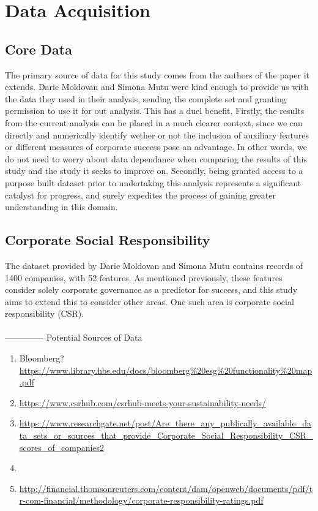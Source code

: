 \section{Data Acquisition}
\subsection{Core Data}
{The primary source of data for this study comes from the authors of the paper it extends. Darie Moldovan and Simona Mutu were kind enough to provide us with the data they used in their analysis, sending the complete set and granting permission to use it for out analysis. This has a duel benefit. Firstly, the results from the current analysis can be placed in a much clearer context, since we can directly and numerically identify wether or not the inclusion of auxiliary features or different measures of corporate success pose an advantage. In other words, we do not need to worry about data dependance when comparing the results of this study and the study it seeks to improve on. Secondly, being granted access to a purpose built dataset prior to undertaking this analysis represents a significant catalyst for progress, and surely expedites the process of gaining greater understanding in this domain.}
\subsection{Corporate Social Responsibility}
{The dataset provided by Darie Moldovan and Simona Mutu contains records of 1400 companies, with 52 features. As mentioned previously, these features consider solely corporate governance as a predictor for success, and this study aims to extend this to consider other areas. One such area is corporate social responsibility (CSR).\\\\
--------------
Potential Sources of Data
\begin{enumerate}
\item{Bloomberg? }\\
\url {https://www.library.hbs.edu/docs/bloomberg%20esg%20functionality%20map.pdf}
\item{\url{https://www.csrhub.com/csrhub-meets-your-sustainability-needs/}}
\item{\url{https://www.researchgate.net/post/Are_there_any_publically_available_data_sets_or_sources_that_provide_Corporate_Social_Responsibility_CSR_scores_of_companies2}}
\item{\cite{rahdari2015designing}}
\item{\url{http://financial.thomsonreuters.com/content/dam/openweb/documents/pdf/tr-com-financial/methodology/corporate-responsibility-ratings.pdf}}
\end{enumerate}}

